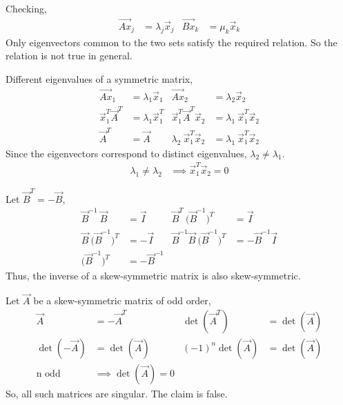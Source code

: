 \begin{enumerate}
{{{    \item Checking,
          \begin{align}
              \vec{Ax}_j & = \lambda_j \vec{x}_j &
              \vec{Bx}_k & = \mu_k \vec{x}_k
          \end{align}
          Only eigenvectors common to the two sets satisfy the required relation. So
          the relation is not true in general.

    \item Different eigenvalues of a symmetric matrix,
          \begin{align}
              \vec{Ax}_1                       & = \lambda_1 \vec{x}_1              &
              \vec{Ax}_2                       & = \lambda_2 \vec{x}_2                \\
              \vec{x}_1^T \vec{A}^T            & = \lambda_1 \vec{x}_1^T            &
              \vec{x}_1^T \vec{A}^T \vec{x}_2  & = \lambda_1\ \vec{x}_1^T \vec{x}_2   \\
              \vec{A}^T                        & = \vec{A}                          &
              \lambda_2\ \vec{x}_1^T \vec{x}_2 & = \lambda_1\ \vec{x}_1^T \vec{x}_2
          \end{align}
          Since the eigenvectors correspond to distinct eigenvalues, $ \lambda_2
              \neq \lambda_1 $.
          \begin{align}
              \lambda_1 \neq \lambda_2 & \implies \vec{x}_1^T \vec{x}_2 = 0
          \end{align}

    \item Let $ \vec{B}^T = -\vec{B} $,
          \begin{align}
              \vec{B}^{-1}\ \vec{B}                          & = \vec{I}  &
              \vec{B}^T\ \Big(\vec{B}^{-1}\Big)^T            & = \vec{I}    \\
              \vec{B}\ \Big(\vec{B}^{-1}\Big)^T              & = -\vec{I} &
              \vec{B}^{-1} \vec{B}\ \Big(\vec{B}^{-1}\Big)^T & =
              -\vec{B}^{-1} \vec{I}                                         \\
              \Big(\vec{B}^{-1}\Big)^T                       & =
              -\vec{B}^{-1}
          \end{align}
          Thus, the inverse of a skew-symmetric matrix is also skew-symmetric.

    \item Let $ \vec{A} $ be a skew-symmetric matrix of odd order,
          \begin{align}
              \vec{A}              & = -\vec{A}^T               &
              \det(\vec{A}^T)      & = \det(\vec{A})              \\
              \det(-\vec{A})       & = \det(\vec{A})            &
              (-1)^n \det(\vec{A}) & = \det(\vec{A})              \\
              \text{n odd}\        & \implies \det(\vec{A}) = 0
          \end{align}
          So, all such matrices are singular. The claim is \textcolor{y_p}{false}.

}}}
\end{enumerate}
